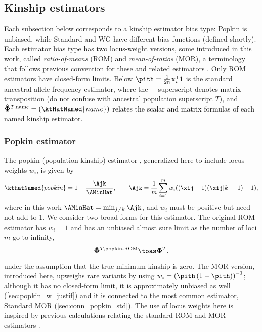 \documentclass[11pt]{article}
\newcommand{\kinMat}[1][T]{%
  \ensuremath{%
    \mathbf{\Phi}^{#1}
  }%
  \xspace%
}%
\newcommand{\kinMatEstNamed}[1]{%
  \ensuremath{%
    \mathbf{\hat{\Phi}}^{T,\text{#1}}
  }%
  \xspace%
}%
\begin{document}
\subsection{Kinship estimators}

Each subsection below corresponds to a kinship estimator bias type: Popkin is unbiased, while Standard and WG have different bias functions (defined shortly).
Each estimator bias type has two locus-weight versions, some introduced in this work, called \textit{ratio-of-means} (ROM) and \textit{mean-of-ratios} (MOR), a terminology that follows previous convention for these and related estimators \citep{bhatia_estimating_2013, ochoa_estimating_2021}.
Only ROM estimators have closed-form limits.
Below
$
\pith
=
\frac{1}{2n} \mathbf{x}_i^\intercal \mathbf{1}
$
is the standard ancestral allele frequency estimator,
where the $\intercal$ superscript denotes matrix transposition (do not confuse with ancestral population superscript $T$),
and
$\kinMatEstNamed{name} = (\ktHatNamed{name})$
relates the scalar and matrix formulas of each named kinship estimator.

\subsubsection{Popkin estimator}

The popkin (population kinship) estimator \citep{ochoa_estimating_2021}, generalized here to include locus weights $w_i$, is given by
\begin{equation}
  \label{eq:popkin}
  \ktHatNamed{popkin}
  =
  1 - \frac{\Ajk}{\AMinHat}
  , \quad\quad
  \Ajk
  =
  \frac{1}{m} \sum_{i=1}^m w_i ( (\xij-1)(\xij[k]-1) - 1 )
  ,
\end{equation}
where in this work $\AMinHat = \min_{j \ne k} \Ajk$, and $w_i$ must be positive but need not add to 1.
We consider two broad forms for this estimator.
The original ROM estimator has $w_i = 1$ and has an unbiased almost sure limit as the number of loci $m$ go to infinity,
$$
\kinMatEstNamed{popkin-ROM} \toas \kinMat,
$$
under the assumption that the true minimum kinship is zero.
The MOR version, introduced here, upweighs rare variants by using $w_i = \left( \pith \left( 1 - \pith \right) \right)^{-1}$; although it has no closed-form limit, it is approximately unbiased as well (\cref{sec:popkin_w_justif}) and it is connected to the most common estimator, Standard MOR (\cref{sec:conn_popkin_std}). 
The use of locus weights here is inspired by previous calculations relating the standard ROM and MOR estimators \citep{wang_efficient_2017}.
\end{document}
